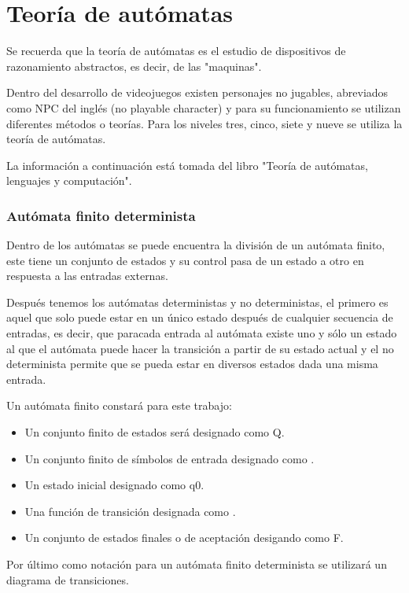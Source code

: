 \section{Teoría de autómatas}\label{teoriaAutomata}
Se recuerda que la teoría de autómatas es el estudio de dispositivos de razonamiento abstractos, es decir, de las "maquinas".

Dentro del desarrollo de videojuegos existen personajes no jugables, abreviados como NPC del inglés (no playable character) y para su funcionamiento se utilizan diferentes métodos o teorías. Para los niveles tres, cinco, siete y nueve se utiliza la teoría de autómatas. 

La información a continuación está tomada del libro "Teoría de autómatas, lenguajes y computación"\cite{libroteo}.
\\[1pt]
	
\subsubsection{Autómata finito determinista}
Dentro de los autómatas se puede encuentra la división de un autómata finito, este tiene un conjunto de estados y su control pasa de un estado a otro en respuesta a las entradas externas.

Después tenemos los autómatas deterministas y no deterministas, el primero es aquel que solo puede estar en un único estado después de cualquier secuencia de entradas, es decir, que paracada entrada al autómata existe uno y sólo un estado al que el autómata puede hacer la transición a partir de su estado actual y el no determinista permite que se pueda estar en diversos estados dada una misma entrada.

Un autómata finito constará para este trabajo:
\begin{itemize}
	\item Un conjunto finito de estados será designado como Q.
	\item Un conjunto finito de símbolos de entrada designado como \sigma.
	\item Un estado inicial designado como q0.
	\item Una función de transición designada como \delta.
	\item Un conjunto de estados finales o de aceptación desigando como F.
\end{itemize}

Por último como notación para un autómata finito determinista se utilizará un diagrama de transiciones.




